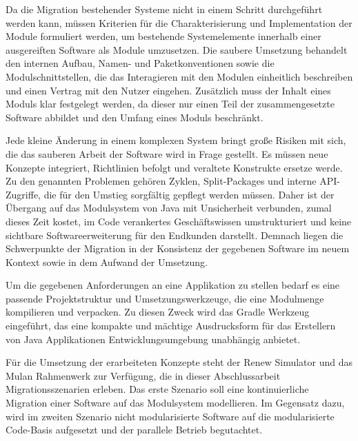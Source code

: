 	Da die Migration bestehender Systeme nicht in einem Schritt durchgeführt werden kann, müssen Kriterien für die Charakterisierung und Implementation der Module formuliert werden, um bestehende Systemelemente innerhalb einer ausgereiften Software als Module umzusetzen. Die saubere Umsetzung behandelt den internen Aufbau, Namen- und Paketkonventionen sowie die Modulschnittstellen, die das Interagieren mit den Modulen einheitlich beschreiben und einen Vertrag mit den Nutzer eingehen. Zusätzlich muss der Inhalt eines Moduls klar festgelegt werden, da dieser nur einen Teil der zusammengesetzte Software abbildet und den Umfang eines Moduls beschränkt.  \bigbreak 

	Jede kleine Änderung in einem komplexen System bringt große Risiken mit sich, die das sauberen Arbeit der Software wird in Frage gestellt. Es müssen neue Konzepte integriert, Richtlinien befolgt und veraltete Konstrukte ersetze werde. Zu den genannten Problemen gehören Zyklen, Split-Packages und interne API-Zugriffe, die für den Umstieg sorgfältig gepflegt werden müssen. Daher ist der Übergang auf das Modulsystem von Java mit Unsicherheit verbunden, zumal dieses Zeit kostet, im Code verankertes Geschäftswissen umstrukturiert und keine sichtbare Softwareerweiterung für den Endkunden darstellt. \newline
	Demnach liegen die Schwerpunkte der Migration in der Konsistenz der gegebenen Software im neuem Kontext sowie in dem Aufwand der Umsetzung. 
	\bigbreak

	Um die gegebenen Anforderungen an eine Applikation zu stellen bedarf es eine passende Projektstruktur und Umsetzungswerkzeuge, die eine Modulmenge kompilieren und verpacken. Zu diesen Zweck wird das Gradle Werkzeug eingeführt, das eine kompakte und mächtige Ausdrucksform für das Erstellern von Java Applikationen Entwicklungsumgebung unabhängig anbietet. \bigbreak

	Für die Umsetzung der erarbeiteten Konzepte steht der Renew Simulator und das Mulan Rahmenwerk zur Verfügung, die in dieser Abschlussarbeit  Migrationsszenarien erleben. Das erste Szenario soll eine kontinuierliche Migration einer Software auf das Modulsystem modellieren. Im Gegensatz dazu, wird im zweiten Szenario nicht modularisierte Software auf die modularisierte Code-Basis aufgesetzt und der parallele Betrieb begutachtet.  

